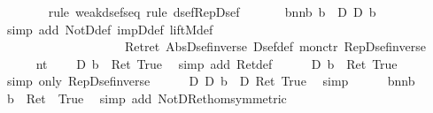 \begin{isabellebody}
\ \ \ \ \ \ \isamarkupfalse%
\ {\isacharparenleft}rule\ weak{\isacharunderscore}dsef{\isacharunderscore}seq{\isacharcomma}\ rule\ dsef{\isacharunderscore}Rep{\isacharunderscore}Dsef{\isacharparenright}\ \isanewline
\ \ \ \ \isamarkupfalse%
\ bnnb{\isacharcolon}\ {\isachardoublequote}b\ {\isacharequal}\ {\isacharparenleft}{\isasymnot}\isactrlsub D\ {\isacharparenleft}{\isasymnot}\isactrlsub D\ b{\isacharparenright}{\isacharparenright}{\isachardoublequote}\isanewline
\ \ \ \ \ \ \isamarkupfalse%
\ {\isacharparenleft}simp\ add{\isacharcolon}\ NotD{\isacharunderscore}def\ impD{\isacharunderscore}def\ liftM{}{\isacharunderscore}def\ \isanewline
\ \ \ \ \ \ \ \ \ \ \ \ \ \ \ \ \ \ \ \ Ret{\isacharunderscore}ret\ Abs{\isacharunderscore}Dsef{\isacharunderscore}inverse\ Dsef{\isacharunderscore}def\ mon{\isacharunderscore}ctr\ Rep{\isacharunderscore}Dsef{\isacharunderscore}inverse{\isacharparenright}\ \isanewline
\ \ \ \ \isamarkupfalse%
\ nt\ \isamarkupfalse%
\ {\isachardoublequote}{\isasymUp}\ {\isacharparenleft}{\isasymDown}\ {\isacharparenleft}{\isasymnot}\isactrlsub D\ b{\isacharparenright}{\isacharparenright}\ {\isacharequal}\ Ret\ True{\isachardoublequote}\ \isamarkupfalse%
\ {\isacharparenleft}simp\ add{\isacharcolon}\ Ret{\isacharunderscore}def{\isacharparenright}\isanewline
\ \ \ \ \isamarkupfalse%
\ {\isachardoublequote}{\isacharparenleft}{\isasymnot}\isactrlsub D\ b{\isacharparenright}\ {\isacharequal}\ Ret\ True{\isachardoublequote}\ \isamarkupfalse%
\ {\isacharparenleft}simp\ only{\isacharcolon}\ Rep{\isacharunderscore}Dsef{\isacharunderscore}inverse{\isacharparenright}\isanewline
\ \ \ \ \isamarkupfalse%
\ {\isachardoublequote}{\isacharparenleft}{\isasymnot}\isactrlsub D\ {\isacharparenleft}{\isasymnot}\isactrlsub D\ b{\isacharparenright}{\isacharparenright}\ {\isacharequal}\ {\isacharparenleft}{\isasymnot}\isactrlsub D\ {\isacharparenleft}Ret\ True{\isacharparenright}{\isacharparenright}{\isachardoublequote}\ \isamarkupfalse%
\ simp\isanewline
\ \ \ \ \isamarkupfalse%
\ bnnb\ \isamarkupfalse%
\ {\isachardoublequote}b\ {\isacharequal}\ Ret\ {\isacharparenleft}{\isasymnot}\ True{\isacharparenright}{\isachardoublequote}\ \isamarkupfalse%
\ {\isacharparenleft}simp\ add{\isacharcolon}\ NotD{\isacharunderscore}Ret{\isacharunderscore}hom{\isacharbrackleft}symmetric{\isacharbrackright}{\isacharparenright}\isanewline
\ \ \ \ \isamarkupfalse%

\end{isabellebody}
